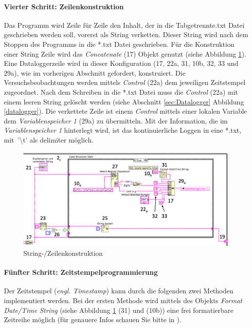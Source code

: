 {\paragraph{Vierter Schritt: Zeilenkonstruktion} Das Programm wird Zeile für Zeile den Inhalt, der in die Tabgetrennte.txt Datei geschrieben werden soll, vorerst als String verketten. Dieser String wird nach dem Stoppen des Programms in die *.txt Datei geschrieben. Für die Konstruktion einer String Zeile wird das \textit{Concatenate} (17) Objekt genutzt (siehe Abbildung \ref{fig:String-/Zeilenkonstruktion}). Eine Dataloggerzeile wird in dieser Konfiguration (17, 22a, 31, 10b, 32, 33 und 29a), wie im vorherigen Abschnitt gefordert, konstruiert. Die Versuchsbeobachtungen werden mittels \textit{Control} (22a) dem jeweiligen Zeitstempel zugeordnet. Nach dem Schreiben in die *.txt Datei muss die \textit{Control} (22a) mit einem leeren String gelöscht werden (siehe Abschnitt \ref{sec:Datalogger} Abbildung \ref{datalogger}). Die verkettete Zeile ist einem \textit{Control} mittels einer lokalen Variable dem \textit{Variablenspeicher 1} (29a) zu übermitteln. Mit der Information, die im \textit{Variablenspeicher 1} hinterlegt wird, ist das kontinuierliche Loggen in eine *.txt, mit \,{\Menlo '\textbackslash t'} als delimiter möglich.

\begin{figure}[h!] %
	\centering
	\includegraphics[width=1.05\textwidth]{Bilder/LabVIEW_serialport/stringkonstruktion.jpg}
	\vspace{2pt}
	\caption[String-/Zeilenkonstruktion]{String-/Zeilenkonstruktion}
	\label{fig:String-/Zeilenkonstruktion}
\end{figure}


\paragraph{Fünfter Schritt: Zeitstempelprogrammierung}  Der Zeitstempel (\textit{engl. Time\-stamp}) kann durch die folgenden zwei Methoden implementiert werden. Bei der ersten Methode wird mittels des Objekts \textit{Format Date/Time String} (siehe Abbildung \ref{fig:String-/Zeilenkonstruktion} (31) und (10b)) eine frei formatierbare Zeitreihe möglich (für genauere Infos schauen Sie bitte in \cite{zeitreihenformatierung}). \\

}

